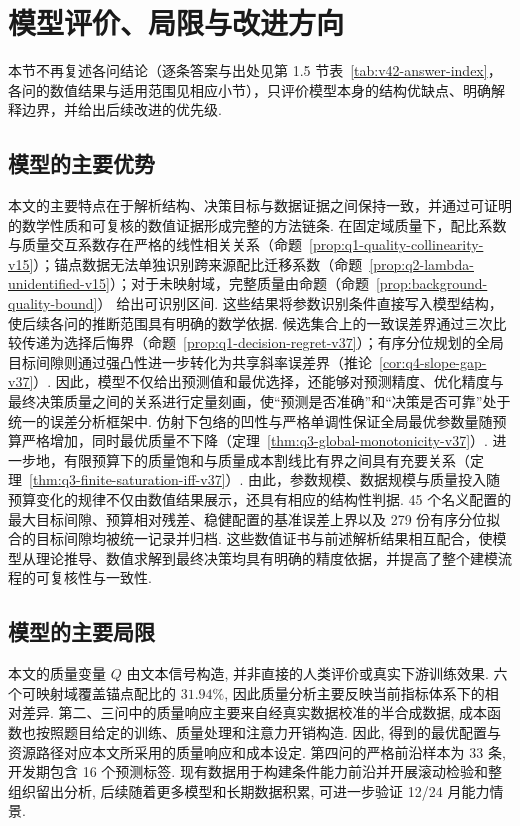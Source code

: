 \section{模型评价、局限与改进方向}\label{sec:conclusion}

本节不再复述各问结论（逐条答案与出处见第 1.5 节表~\ref{tab:v42-answer-index}，各问的数值结果与适用范围见相应小节），只评价模型本身的结构优缺点、明确解释边界，并给出后续改进的优先级. 

\subsection{模型的主要优势}
本文的主要特点在于解析结构、决策目标与数据证据之间保持一致，并通过可证明的数学性质和可复核的数值证据形成完整的方法链条.
\setcounter{obsitem}{0}
在固定域质量下，配比系数与质量交互系数存在严格的线性相关关系（命题~\ref{prop:q1-quality-collinearity-v15}）；锚点数据无法单独识别跨来源配比迁移系数（命题~\ref{prop:q2-lambda-unidentified-v15}）；对于未映射域，完整质量由命题（命题~\ref{prop:background-quality-bound}） 给出可识别区间. 这些结果将参数识别条件直接写入模型结构，使后续各问的推断范围具有明确的数学依据.
候选集合上的一致误差界通过三次比较传递为选择后悔界（命题~\ref{prop:q1-decision-regret-v37}）；有序分位规划的全局目标间隙则通过强凸性进一步转化为共享斜率误差界（推论~\ref{cor:q4-slope-gap-v37}）. 因此，模型不仅给出预测值和最优选择，还能够对预测精度、优化精度与最终决策质量之间的关系进行定量刻画，使“预测是否准确”和“决策是否可靠”处于统一的误差分析框架中.
仿射下包络的凹性与严格单调性保证全局最优参数量随预算严格增加，同时最优质量不下降（定理~\ref{thm:q3-global-monotonicity-v37}）. 进一步地，有限预算下的质量饱和与质量成本割线比有界之间具有充要关系（定理~\ref{thm:q3-finite-saturation-iff-v37}）. 由此，参数规模、数据规模与质量投入随预算变化的规律不仅由数值结果展示，还具有相应的结构性判据.
45 个名义配置的最大目标间隙、预算相对残差、稳健配置的基准误差上界以及 279 份有序分位拟合的目标间隙均被统一记录并归档. 这些数值证书与前述解析结果相互配合，使模型从理论推导、数值求解到最终决策均具有明确的精度依据，并提高了整个建模流程的可复核性与一致性.


\subsection{模型的主要局限}
\setcounter{obsitem}{0}
本文的质量变量 $Q$ 由文本信号构造, 并非直接的人类评价或真实下游训练效果. 六个可映射域覆盖锚点配比的 $31.94\%$, 因此质量分析主要反映当前指标体系下的相对差异.
第二、三问中的质量响应主要来自经真实数据校准的半合成数据, 成本函数也按照题目给定的训练、质量处理和注意力开销构造. 因此, 得到的最优配置与资源路径对应本文所采用的质量响应和成本设定.
第四问的严格前沿样本为 33 条, 开发期包含 16 个预测标签. 现有数据用于构建条件能力前沿并开展滚动检验和整组织留出分析, 后续随着更多模型和长期数据积累, 可进一步验证 12/24 月能力情景.

